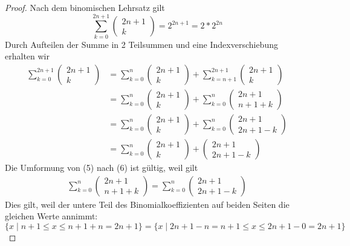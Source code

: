 \documentclass[a4paper,10pt]{article}
\begin{document}
\begin{proof}
 Nach dem binomischen Lehrsatz gilt
 \begin{equation}
  \sum_{k = 0}^{2n + 1} \begin{pmatrix}2n + 1\\k\end{pmatrix} = 2^{2n + 1} = 2 * 2^{2n}
 \end{equation}
 Durch Aufteilen der Summe in 2 Teilsummen und eine Indexverschiebung erhalten wir
 \begin{align}
  \sum_{k = 0}^{2n + 1} \begin{pmatrix}2n + 1\\k\end{pmatrix} & = \sum_{k = 0}^{n} \begin{pmatrix}2n + 1\\k\end{pmatrix} + \sum_{k = n + 1}^{2n + 1} \begin{pmatrix}2n + 1\\k\end{pmatrix}\\
  & = \sum_{k = 0}^{n} \begin{pmatrix}2n + 1\\k\end{pmatrix} + \sum_{k = 0}^{n} \begin{pmatrix}2n + 1\\n + 1 + k\end{pmatrix}\\
  & = \sum_{k = 0}^{n} \begin{pmatrix}2n + 1\\k\end{pmatrix} + \sum_{k = 0}^{n} \begin{pmatrix}2n + 1\\2n + 1 - k\end{pmatrix}\\
  & = \sum_{k = 0}^{n} \begin{pmatrix}2n + 1\\k\end{pmatrix} + \begin{pmatrix}2n + 1\\2n + 1 - k\end{pmatrix}
 \end{align}
 Die Umformung von (5) nach (6) ist gültig, weil gilt
 \begin{align}
  \sum_{k = 0}^{n} \begin{pmatrix}2n + 1\\n + 1 + k\end{pmatrix} = \sum_{k = 0}^{n} \begin{pmatrix}2n + 1\\2n + 1 - k\end{pmatrix}
 \end{align}
 Dies gilt, weil der untere Teil des Binomialkoeffizienten auf beiden Seiten die gleichen Werte annimmt:
 \begin{equation*}
  \{ x \mid n + 1\le x \le n + 1 + n = 2n + 1 \} = \{ x \mid 2n + 1 - n = n + 1 \le x \le 2n + 1 - 0 = 2n + 1 \}
 \end{equation*}
 

\end{proof}
\end{document}
